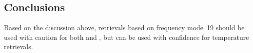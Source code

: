 \subsection{Conclusions}
\label{sec:fm19:conclusions}
Based on the discussion above, retrievals based on frequency mode~19 should be
used with caution for both  and , but can be used with
confidence for temperature retrievals.
